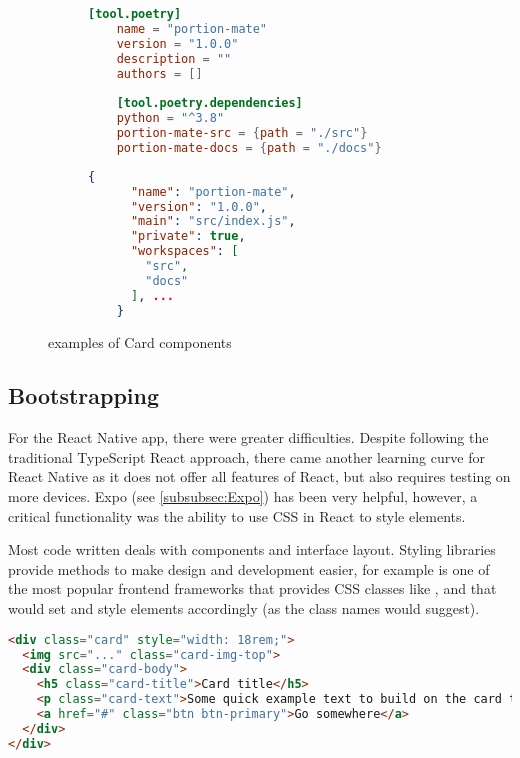 \documentclass[../main.tex]{subfiles}
\begin{document}
\begin{figure}
    \centering
    \noindent\begin{subfigure}{.49\textwidth}
    \begin{lstlisting}[language=toml, caption={Including the sub-packages as dependencies in \citecode{pyprojecttoml}}]
    [tool.poetry]
    name = "portion-mate"
    version = "1.0.0"
    description = ""
    authors = []
    
    [tool.poetry.dependencies]
    python = "^3.8"
    portion-mate-src = {path = "./src"}
    portion-mate-docs = {path = "./docs"}
    \end{lstlisting}
    \end{subfigure}\hfill
    \begin{subfigure}{.49\textwidth}
    \begin{lstlisting}[language=json, caption={Including the directories as workspaces in \citecode{PackageJson}}]
    {
      "name": "portion-mate",
      "version": "1.0.0",
      "main": "src/index.js",
      "private": true,
      "workspaces": [
        "src",
        "docs"
      ], ...
    }
    \end{lstlisting}
    \end{subfigure}
    \caption{examples of Card components}
\end{figure}

\subsection*{Bootstrapping}

For the React Native app, there were greater difficulties. Despite following the traditional TypeScript React approach, there came another learning curve for React Native as it does not offer all features of React, but also requires testing on more devices. Expo (see \ref{subsubsec:Expo}) has been very helpful, however, a critical functionality was the ability to use CSS in React to style elements.

Most code written deals with components and interface layout. Styling libraries provide methods to make design and development easier, for example  is one of the most popular frontend frameworks that provides CSS classes like ,  and  that would set and style elements accordingly (as the class names would suggest).

\begin{lstlisting}[language=html, caption={Example of a Card element as \href{https://getbootstrap.com/docs/5.1/components/card/\#example}{documented on Bootstrap v5} \cite{Cards}}]
<div class="card" style="width: 18rem;">
  <img src="..." class="card-img-top">
  <div class="card-body">
    <h5 class="card-title">Card title</h5>
    <p class="card-text">Some quick example text to build on the card title and make up the bulk of the card's content.</p>
    <a href="#" class="btn btn-primary">Go somewhere</a>
  </div>
</div>
\end{lstlisting}
\end{document}
